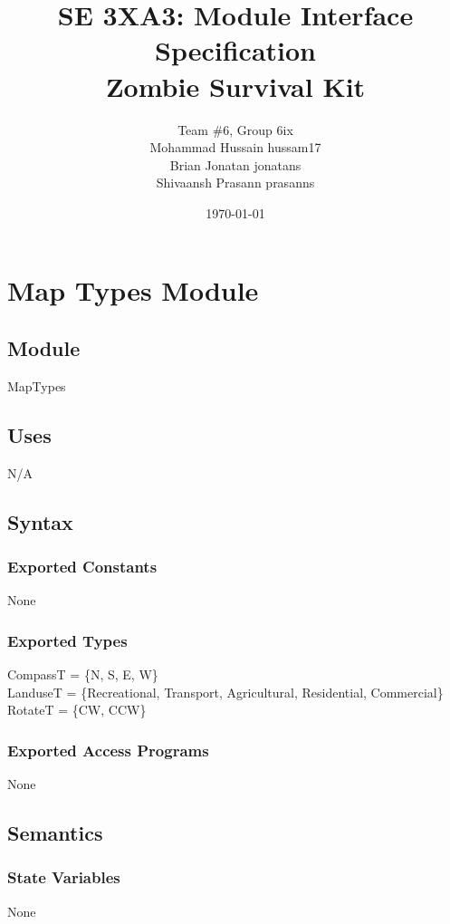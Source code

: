 \documentclass[12pt]{article}
\title{SE 3XA3: Module Interface Specification\\Zombie Survival Kit}
\author{Team \#6, Group 6ix
		\\ Mohammad Hussain hussam17
		\\ Brian Jonatan jonatans
		\\ Shivaansh Prasann prasanns
}
\date{\today}
\begin{document}
\newpage

\section* {Map Types Module}

\subsection*{Module}

MapTypes

\subsection* {Uses}

N/A

\subsection* {Syntax}

\subsubsection* {Exported Constants}

None

\subsubsection* {Exported Types}

CompassT = \{N, S, E, W\}\\ 
LanduseT = \{Recreational, Transport, Agricultural, Residential, Commercial\}\\
RotateT = \{CW, CCW\}

\subsubsection* {Exported Access Programs}

None

\subsection* {Semantics}

\subsubsection* {State Variables}

None
\end{document}
